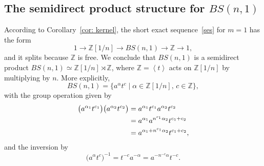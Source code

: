 \documentclass[english]{amsart}
\newtheorem{lem}[thm]{Lemma}
\theoremstyle{definition}
\newcommand\ZZ{\mathbb{Z}}
\newcommand{\gen}[1]{\left\langle#1\right\rangle}
\newcommand{\ncl}[1]{\ll \!#1 \!\gg}
\begin{document}

\subsection{The semidirect product structure for $BS(n,1)$}\label{sec: semi direct}

According to Corollary~\ref{cor: kernel}, the short exact sequence~\eqref{ses} for $m=1$ has the form 
 $$
1\to \mathbb{Z}[1/n] \to BS(n,1) \to \mathbb{Z} \to 1,
 $$
and it splits because $\ZZ$ is free. We conclude that $BS(n, 1)$ is a semidirect product $BS(n, 1) \simeq \mathbb{Z}[1/n] \rtimes \mathbb{Z}$, where $\ZZ=\gen{t}$ acts on $\ZZ[1/n]$ by multiplying by $n$. More explicitly, 
 $$
BS(n,1)=\{ a^{\alpha}t^c \mid \alpha\in \ZZ[1/n],\, c\in \ZZ\},
 $$
with the group operation given by 
 \begin{align}\label{eq: product}
\big( a^{\alpha_1}t^{c_1} \big)\big( a^{\alpha_2}t^{c_2} \big) &= a^{\alpha_1}t^{c_1} a^{\alpha_2}t^{c_2} \notag \\ &= a^{\alpha_1} a^{n^{c_1}\alpha_2}t^{c_1+c_2} \\ &= a^{\alpha_1 +n^{c_1}\alpha_2} t^{c_1+c_2}, \notag
 \end{align}
and the inversion by 
 \begin{equation}\label{eq: inverse}
\big( a^{\alpha}t^c \big)^{-1} =t^{-c}a^{-\alpha}=a^{-n^{-c}\alpha}t^{-c}.
 \end{equation}


\end{document}
